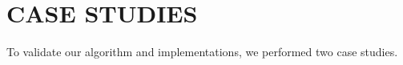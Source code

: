 \section{CASE STUDIES}
To validate our algorithm and implementations, we performed two case studies.

%
